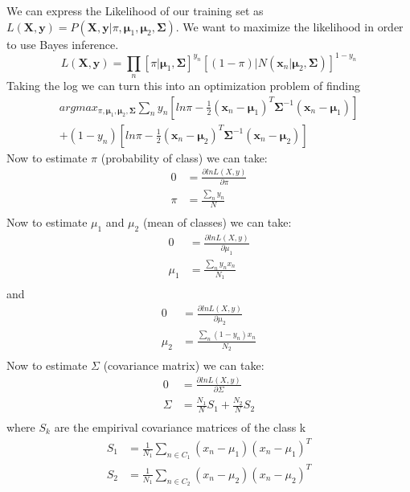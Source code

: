 \documentclass[12pt]{article}
\begin{document}
            We can express the Likelihood of our training set as $L(\boldsymbol{X},\boldsymbol{y}) = P(\boldsymbol{X},\boldsymbol{y}|\pi,\boldsymbol{\mu}_1,\boldsymbol{\mu}_2,\boldsymbol{\Sigma})$. We want to maximize the likelihood in order to use Bayes inference.
            $$ L(\boldsymbol{X},\boldsymbol{y}) = \prod_{n}{[\pi|\boldsymbol{\mu}_1, \boldsymbol{\Sigma}]^{y_n}[(1-\pi)|N(\boldsymbol{x}_n|\boldsymbol{\mu}_2,\boldsymbol{\Sigma})]^{1-y_n}} $$
            Taking the log we can turn this into an optimization problem of finding
            \begin{multline*}
                argmax_{\pi, \boldsymbol{\mu}_1, \boldsymbol{\mu}_2, \boldsymbol{\Sigma}} \sum _{n}y_n[ln\pi - \frac{1}{2}(\boldsymbol{x}_n - \boldsymbol{\mu}_1)^T \boldsymbol{\Sigma}^{-1}(\boldsymbol{x}_n-\boldsymbol{\mu}_1)]\\ 
                + (1-y_n)[ln\pi - \frac{1}{2}(\boldsymbol{x}_n - \boldsymbol{\mu}_2)^T \boldsymbol{\Sigma}^{-1}(\boldsymbol{x}_n-\boldsymbol{\mu}_2)]
            \end{multline*}
            Now to estimate $\pi$ (probability of class) we can take:
            \begin{align*}
                0 &= \frac{\partial lnL(X,y)}{\partial \pi} \\
                \pi &= \frac{\sum_n{y_n}}{N} \\
            \end{align*}
            Now to estimate $\mu_1$ and $\mu_2$ (mean of classes) we can take:
            \begin{align*}
                0 &= \frac{\partial lnL(X,y)}{\partial \mu_1} \\
                \mu_1 &= \frac{\sum_n{y_n}{x_n}}{N_1} \\
            \end{align*}
            and 
            \begin{align*}
                0 &= \frac{\partial lnL(X,y)}{\partial \mu_2} \\
                \mu_2 &= \frac{\sum_n{(1-y_n)}{x_n}}{N_2} \\
            \end{align*}
            Now to estimate $\Sigma$ (covariance matrix) we can take:
            \begin{align*}
                0 &= \frac{\partial lnL(X,y)}{\partial \Sigma} \\
               \Sigma &= \frac{N_1}{N}S_1 + \frac{N_2}{N}S_2\\
            \end{align*}
            where $S_k$ are the empirival covariance matrices of the class k
            \begin{align*}
                S_1 &= \frac{1}{N_1}\sum _{n\in C_1}{(x_n-\mu_1)(x_n-\mu_1)^T}\\
                S_2 &= \frac{1}{N_1}\sum _{n\in C_2}{(x_n-\mu_2)(x_n-\mu_2)^T}\\
            \end{align*}
\end{document}

